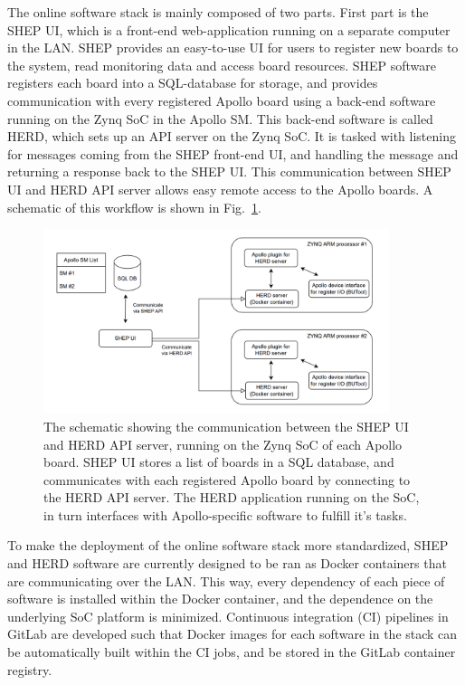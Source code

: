 The online software stack is mainly composed of two parts. First part is the SHEP UI, which is a front-end web-application
running on a separate computer in the LAN. SHEP provides an easy-to-use UI for users to register new boards to the system,
read monitoring data and access board resources. SHEP software registers each board into a SQL-database for storage, and
provides communication with every registered Apollo board using a back-end software running on the Zynq SoC in the Apollo SM.
This back-end software is called HERD, which sets up an API server on the Zynq SoC. It is tasked with listening for messages 
coming from the SHEP front-end UI, and handling the message and returning a response back to the SHEP UI. This communication
between SHEP UI and HERD API server allows easy remote access to the Apollo boards. A schematic of this workflow is shown in
Fig.~\ref{fig:shep_herd_schematic}.

\begin{figure}[htbp]
    \centering
    \includegraphics[width=0.9\textwidth]{TrackerUpgrade/SHEP_HERD.png}
    \caption{The schematic showing the communication between the SHEP UI and HERD API server, running on the Zynq SoC of each
    Apollo board. SHEP UI stores a list of boards in a SQL database, and communicates with each registered Apollo board by
    connecting to the HERD API server. The HERD application running on the SoC, in turn interfaces with Apollo-specific software
    to fulfill it's tasks.}
    \label{fig:shep_herd_schematic}
\end{figure}

To make the deployment of the online software stack more standardized, SHEP and HERD software are currently designed to be ran
as Docker containers that are communicating over the LAN. This way, every dependency of each piece of software is installed within
the Docker container, and the dependence on the underlying SoC platform is minimized. Continuous integration (CI) pipelines in
GitLab are developed such that Docker images for each software in the stack can be automatically built within the CI jobs, and
be stored in the GitLab container registry.

\clearpage
